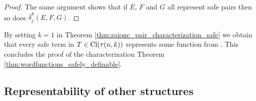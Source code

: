 \begin{proof}
  The same argument shows that if $E$, $F$ and $G$ all represent safe pairs
then so does $\overline \delta^k_j (E,F,G)$.
\end{proof}


By setting $k=1$ in Theorem \ref{thm:zaionc_pair_characterization_safe} we obtain that every safe term in $T \in {\rm Cl}(\tau(n,k))$ represents some function from \safedefset. This concludes the proof of the characterization Theorem \ref{thm:wordfunctions_safely_definable}.


\subsection{Representability of other structures}\hfill

